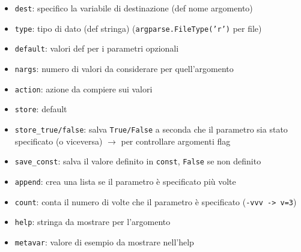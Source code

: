 \begin{itemize}
\item \texttt{dest}: specifico la variabile di destinazione (def nome argomento)
\item \texttt{type}: tipo di dato (def stringa) (\texttt{argparse.FileType('r')} per file)
\item \texttt{default}: valori def per i parametri opzionali
\item \texttt{nargs}: numero di valori da considerare per quell'argomento
\item \texttt{action}: azione da compiere sui valori
\item \texttt{store}: default
\item \texttt{store_true/false}: salva \texttt{True/False} a seconda che il parametro sia stato specificato (o viceversa) $\rightarrow$ per controllare argomenti flag
\item \texttt{save_const}: salva il valore definito in \texttt{const}, \texttt{False} se non definito
\item \texttt{append}: crea una lista se il parametro \`e specificato pi\`u volte
\item \texttt{count}: conta il numero di volte che il parametro \`e specificato (\texttt{-vvv -> v=3})
\item \texttt{help}: stringa da mostrare per l'argomento
\item \texttt{metavar}: valore di esempio da mostrare nell'help
\end{itemize}



